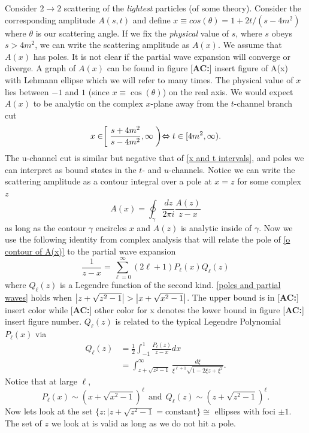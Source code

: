 \documentclass[a4paper,11pt]{article}
\newcommand{\ac}[1]{\textcolor{green3}{[\textbf{AC:}] #1}}
\begin{document}
Consider $2\rightarrow 2$ scattering of the \textit{lightest} particles (of some theory). Consider the corresponding amplitude $A(s,t)$ and define $x\equiv cos(\theta) = 1+2t/(s-4m^2)$ where $\theta$ is our scattering angle. If we fix the \textit{physical} value of $s$, where $s$ obeys $s>4m^2$, we can write the scattering amplitude as $A(x)$. We assume that $A(x)$ has poles. It is not clear if the partial wave expansion will converge or diverge. A graph of $A(x)$ can be found in figure \ac{insert figure of A(x) with Lehmann ellipse} which we will refer to many times. The physical value of $x$ lies between $-1$ and $1$ (since $x\equiv \cos(\theta)$) on the real axis. We would expect $A(x)$ to be analytic on the complex $x$-plane away from the $t$-channel branch cut
\begin{equation}
    x\in \biggm[\frac{s+4m^2}{s-4m^2},\infty\biggm)\Leftrightarrow t\in [4m^2,\infty)\label{x and t intervals}.
\end{equation}
The u-channel cut is similar but negative that of \eqref{x and t intervals}, and poles we can interpret as bound states in the $t$- and $u$-channels. Notice we can write the scattering amplitude as a contour integral over a pole at $x=z$ for some complex $z$
\begin{equation}
    A(x) = \oint_\gamma \frac{dz}{2\pi i}\frac{A(z)}{z-x}\label{o contour of A(x)}
\end{equation}
as long as the contour $\gamma$ encircles $x$ and $A(z)$ is analytic inside of $\gamma$. Now we use the following identity from complex analysis that will relate the pole of \eqref{o contour of A(x)} to the partial wave expansion
\begin{equation}
    \frac{1}{z-x} = \sum_{\ell = 0}^\infty(2\ell+1)P_\ell(x)Q_\ell(z)\label{poles and partial waves}
\end{equation}
where $Q_\ell(z)$ is a Legendre function of the second kind. \eqref{poles and partial waves} holds when $\abs{z+\sqrt{z^2-1}}>\abs{x+\sqrt{x^2-1}}$. The upper bound is in \ac{insert color} while \ac{other color for x} denotes the lower bound in figure \ac{insert figure number}. $Q_\ell(z)$ is related to the typical Legendre Polynomial $P_\ell(x)$ via
\begin{align}
    Q_\ell(z) & = \frac{1}{2}\int_{-1}^1\frac{P_\ell(z)}{z-x}dx \nonumber\\
    & = \int_{z + \sqrt{z^2-1}}^\infty \frac{d\xi}{\xi^{\ell+1}\sqrt{1-2\xi z + \xi^2}}\label{relation of p to q}.
\end{align}
Notice that at large $\ell$,
\begin{equation}
    P_\ell(x)\sim \left(x +\sqrt{x^2-1}\right)^\ell\:\:\text{and}\:\:Q_\ell(z)\sim \left(z + \sqrt{z^2-1}\right)^\ell.
\end{equation}
Now lets look at the set $\{z:|z+\sqrt{z^2-1} = \text{constant}\}\cong$ ellipses with foci $\pm 1$. The set of $z$ we look at is valid as long as we do not hit a pole. 
\end{document}
